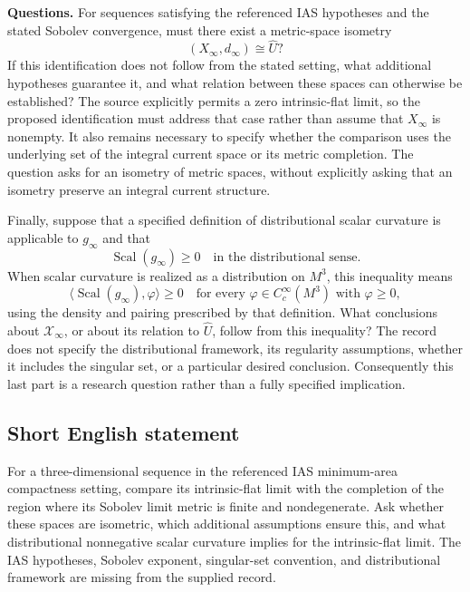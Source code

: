 \documentclass[11pt]{article}
\begin{document}
\textbf{Questions.} For sequences satisfying the referenced IAS hypotheses and the stated Sobolev convergence, must there exist a metric-space isometry
\[
 (X_\infty,d_\infty)\cong\widehat U?
\]
If this identification does not follow from the stated setting, what additional hypotheses guarantee it, and what relation between these spaces can otherwise be established? The source explicitly permits a zero intrinsic-flat limit, so the proposed identification must address that case rather than assume that \(X_\infty\) is nonempty. It also remains necessary to specify whether the comparison uses the underlying set of the integral current space or its metric completion. The question asks for an isometry of metric spaces, without explicitly asking that an isometry preserve an integral current structure.

Finally, suppose that a specified definition of distributional scalar curvature is applicable to \(g_\infty\) and that
\[
 \operatorname{Scal}(g_\infty)\geq0
 \quad\text{in the distributional sense}.
\]
When scalar curvature is realized as a distribution on \(M^3\), this inequality means
\[
 \langle\operatorname{Scal}(g_\infty),\varphi\rangle\geq0
 \quad\text{for every }\varphi\in C_c^\infty(M^3)
 \text{ with }\varphi\geq0,
\]
using the density and pairing prescribed by that definition. What conclusions about \(\mathcal X_\infty\), or about its relation to \(\widehat U\), follow from this inequality? The record does not specify the distributional framework, its regularity assumptions, whether it includes the singular set, or a particular desired conclusion. Consequently this last part is a research question rather than a fully specified implication.
\subsection{Short English statement}
For a three-dimensional sequence in the referenced IAS minimum-area compactness setting, compare its intrinsic-flat limit with the completion of the region where its Sobolev limit metric is finite and nondegenerate. Ask whether these spaces are isometric, which additional assumptions ensure this, and what distributional nonnegative scalar curvature implies for the intrinsic-flat limit. The IAS hypotheses, Sobolev exponent, singular-set convention, and distributional framework are missing from the supplied record.
\end{document}
